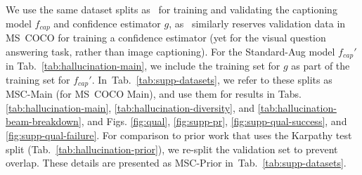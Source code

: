 \documentclass[10pt,twocolumn,letterpaper]{article}
\newcommand{\tabref}[1]{Tab.\xspace~\ref{#1}}
\newcommand{\minisection}[1]{\noindent{\textbf{#1.}}}
\begin{document}
\minisection{MS~COCO Captions} We use the same dataset splits as~\cite{whitehead2022reliable} for training and validating the captioning model $f_{\mathit{cap}}$ and confidence estimator $g$, as~\cite{whitehead2022reliable} similarly reserves validation data in MS~COCO for training a confidence estimator (yet for the visual question answering task, rather than image captioning). For the Standard-Aug model $f_{\mathit{cap}}'$ in \tabref{tab:hallucination-main}, we include the training set for $g$ as part of the training set for $f_{\mathit{cap}}'$.  In~\tabref{tab:supp-datasets}, we refer to these splits as MSC-Main (for MS~COCO Main), and use them for results in Tabs. \ref{tab:hallucination-main}, \ref{tab:hallucination-diversity}, and \ref{tab:hallucination-beam-breakdown}, and Figs. \ref{fig:qual}, \ref{fig:supp-pr}, \ref{fig:supp-qual-success}, and \ref{fig:supp-qual-failure}. For comparison to prior work that uses the Karpathy test split (\tabref{tab:hallucination-prior}), we re-split the validation set to prevent overlap. These details are presented as MSC-Prior in~\tabref{tab:supp-datasets}.


\begin{table}
  \centering

\end{table}
 
\end{document}
